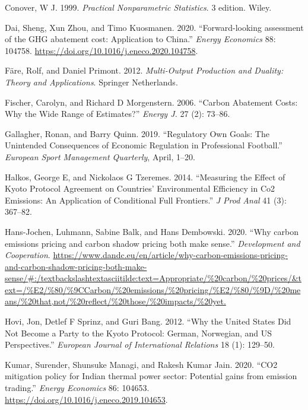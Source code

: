 \documentclass[
  letterpaper,
  DIV=11,
  numbers=noendperiod]{scrartcl}
\newlength{\cslhangindent}
\newlength{\cslentryspacingunit} %
\newenvironment{CSLReferences}[2] %
 {%
  \setlength{\parindent}{0pt}
  \ifodd #1
  \let\oldpar\par
  \def\par{\hangindent=\cslhangindent\oldpar}
  \fi
  \setlength{\parskip}{#2\cslentryspacingunit}
 }%
 {}
\begin{document}
\begin{CSLReferences}{1}{0}
\leavevmode{}%
Conover, W J. 1999. \emph{Practical Nonparametric Statistics}. 3
edition. Wiley.

\leavevmode{}%
Dai, Sheng, Xun Zhou, and Timo Kuosmanen. 2020. {``{Forward-looking
assessment of the GHG abatement cost: Application to China}.''}
\emph{Energy Economics} 88: 104758.
\url{https://doi.org/10.1016/j.eneco.2020.104758}.

\leavevmode{}%
Färe, Rolf, and Daniel Primont. 2012. \emph{{Multi-Output} Production
and Duality: Theory and Applications}. Springer Netherlands.

\leavevmode{}%
Fischer, Carolyn, and Richard D Morgenstern. 2006. {``Carbon Abatement
Costs: Why the Wide Range of Estimates?''} \emph{Energy J.} 27 (2):
73--86.

\leavevmode{}%
Gallagher, Ronan, and Barry Quinn. 2019. {``Regulatory Own Goals: The
Unintended Consequences of Economic Regulation in Professional
Football.''} \emph{European Sport Management Quarterly}, April, 1--20.

\leavevmode{}%
Halkos, George E, and Nickolaos G Tzeremes. 2014. {``Measuring the
Effect of Kyoto Protocol Agreement on Countries' Environmental
Efficiency in {Co2} Emissions: An Application of Conditional Full
Frontiers.''} \emph{J Prod Anal} 41 (3): 367--82.

\leavevmode{}%
Hans-Jochen, Luhmann, Sabine Balk, and Hans Dembowski. 2020. {``{Why
carbon emissions pricing and carbon shadow pricing both make sense}.''}
\emph{Development and Cooperation}.
\url{https://www.dandc.eu/en/article/why-carbon-emissions-pricing-and-carbon-shadow-pricing-both-make-sense/\#:/textbackslashtextasciitilde:text=Appropriate/\%20carbon/\%20prices/\&text=/\%E2/\%80/\%9CCarbon/\%20emissions/\%20pricing/\%E2/\%80/\%9D/\%20means/\%20that,not/\%20reflect/\%20those/\%20impacts/\%20yet.}

\leavevmode{}%
Hovi, Jon, Detlef F Sprinz, and Guri Bang. 2012. {``Why the United
States Did Not Become a Party to the Kyoto Protocol: German, Norwegian,
and {US} Perspectives.''} \emph{European Journal of International
Relations} 18 (1): 129--50.

\leavevmode{}%
Kumar, Surender, Shunsuke Managi, and Rakesh Kumar Jain. 2020. {``{CO2
mitigation policy for Indian thermal power sector: Potential gains from
emission trading}.''} \emph{Energy Economics} 86: 104653.
\url{https://doi.org/10.1016/j.eneco.2019.104653}.


\end{CSLReferences}
\end{document}
